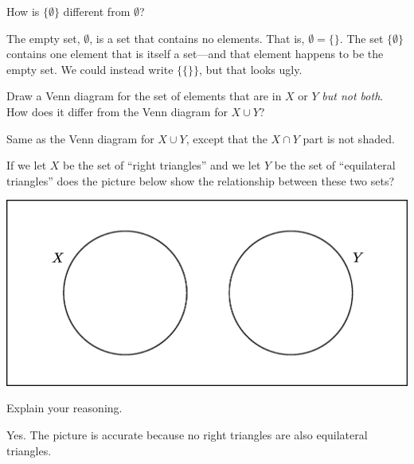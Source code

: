 \documentclass[nooutcomes]{ximera}
\begin{document}
\begin{problem}
How is $\{\emptyset\}$ different from $\emptyset$?  
\begin{freeResponse}
\begin{hint}
The empty set, $\emptyset$, is a set that contains no elements.  That is, $\emptyset = \{\}$.  The set $\{\emptyset\}$ contains one element that is itself a set---and that element happens to be the empty set.  We could instead write $\{\{\}\}$, but that looks ugly.
\end{hint}
\end{freeResponse}
\end{problem}

\begin{problem}
Draw a Venn diagram for the set of elements that are in $X$ or $Y$ \emph{but not both}. 
How does it differ from the Venn diagram for $X\cup Y$?  
\begin{freeResponse}
\begin{hint}
Same as the Venn diagram for $X\cup Y$, except that the $X\cap Y$ part is not shaded.  
\end{hint}
\end{freeResponse}
\end{problem}

\begin{problem}
If we let $X$ be the set of ``right triangles'' and we let $Y$ be the set of ``equilateral triangles'' does the picture below show the relationship between these two sets?
\begin{image}
  \includegraphics{set4.png}
\end{image}
Explain your reasoning.
\begin{freeResponse}
\begin{hint}
Yes.  The picture is accurate because no right triangles are also equilateral triangles.  
\end{hint}
\end{freeResponse}
\end{problem}
\end{document}

